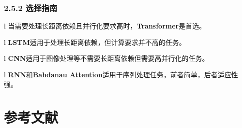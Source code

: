 \subsubsection{\texorpdfstring{\textbf{2.5.2
选择指南}}{2.5.2 选择指南}}\label{252-ux9009ux62e9ux6307ux5357}

l 当需要处理长距离依赖且并行化要求高时，\textbf{Transformer}是首选。

l \textbf{LSTM}适用于处理长距离依赖，但计算要求并不高的任务。

l \textbf{CNN}适用于图像处理等不需要长距离依赖但需要高并行化的任务。

l \textbf{RNN}和\textbf{Bahdanau
Attention}适用于序列处理任务，前者简单，后者适应性强。

\section{\texorpdfstring{\textbf{参考文献}}{参考文献}}\label{ux53c2ux8003ux6587ux732e}
